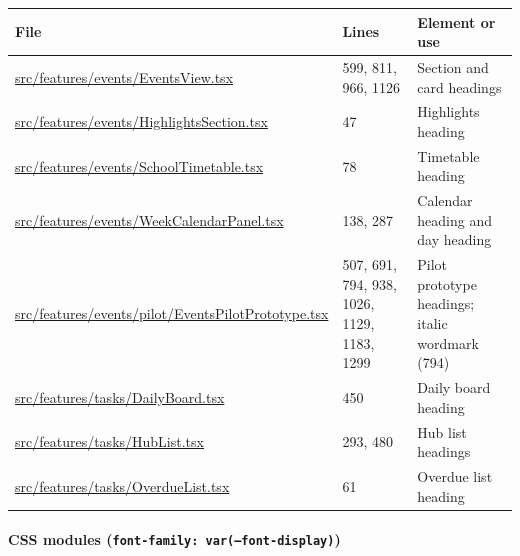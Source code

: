 \documentclass[11pt,a4paper]{article}
\DeclareRobustCommand{\file}[1]{{\ttfamily\small\url{#1}}}
\begin{document}
\begin{longtable}{@{}p{6.2cm}p{3.2cm}p{4.2cm}@{}}
\toprule
File & Lines & Element or use \\
\midrule
\endhead
\file{src/features/events/EventsView.tsx} & 599, 811, 966, 1126 & Section and card headings \\
\file{src/features/events/HighlightsSection.tsx} & 47 & Highlights heading \\
\file{src/features/events/SchoolTimetable.tsx} & 78 & Timetable heading \\
\file{src/features/events/WeekCalendarPanel.tsx} & 138, 287 & Calendar heading and day heading \\
\file{src/features/events/pilot/EventsPilotPrototype.tsx} & 507, 691, 794, 938, 1026, 1129, 1183, 1299 & Pilot prototype headings; italic wordmark (794) \\
\file{src/features/tasks/DailyBoard.tsx} & 450 & Daily board heading \\
\file{src/features/tasks/HubList.tsx} & 293, 480 & Hub list headings \\
\file{src/features/tasks/OverdueList.tsx} & 61 & Overdue list heading \\
\bottomrule
\end{longtable}

\paragraph{CSS modules (\texttt{font-family: var(--font-display)})}
\end{document}
